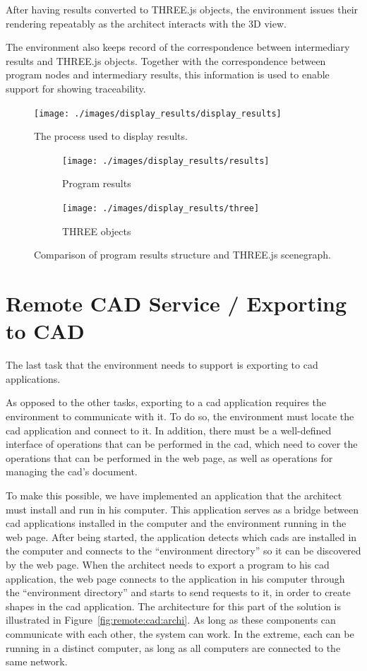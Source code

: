 After having results converted to THREE.js objects, the environment issues their rendering repeatably as the architect interacts with the 3D view.

The environment also keeps record of the correspondence between intermediary results and THREE.js objects.
Together with the correspondence between program nodes and intermediary results, this information is used to enable support for showing traceability.

\begin{figure}
  \centering
  \texttt{[image: ./images/display\_results/display\_results]}
  \caption{The process used to display results.}
  \label{fig:display:results}
\end{figure}

\begin{figure}
  \centering
  \begin{subfigure}[b]{0.45\textwidth}
    \texttt{[image: ./images/display\_results/results]}
    \caption{Program results}
  \end{subfigure}
  \begin{subfigure}[b]{0.45\textwidth}
    \texttt{[image: ./images/display\_results/three]}
    \caption{THREE objects}
  \end{subfigure}
  \caption{Comparison of program results structure and THREE.js scenegraph.}
  \label{fig:results:vs:three}
\end{figure}


\section{Remote CAD Service / Exporting to CAD}
The last task that the environment needs to support is exporting to \gls{cad} applications.

As opposed to the other tasks, exporting to a \gls{cad} application requires the environment to communicate with it.
To do so, the environment must locate the \gls{cad} application and connect to it.
In addition, there must be a well-defined interface of operations that can be performed in the \gls{cad}, which need to cover the operations that can be performed in the web page, as well as operations for managing the \gls{cad}'s document.

To make this possible, we have implemented an application that the architect must install and run in his computer.
This application serves as a bridge between \gls{cad} applications installed in the computer and the environment running in the web page.
After being started, the application detects which \glspl{cad} are installed in the computer and connects to the ``environment directory'' so it can be discovered by the web page.
When the architect needs to export a program to his \gls{cad} application, the web page connects to the application in his computer through the ``environment directory'' and starts to send requests to it, in order to create shapes in the \gls{cad} application.
The architecture for this part of the solution is illustrated in Figure~\ref{fig:remote:cad:archi}.
As long as these components can communicate with each other, the system can work.
In the extreme, each can be running in a distinct computer, as long as all computers are connected to the same network.

